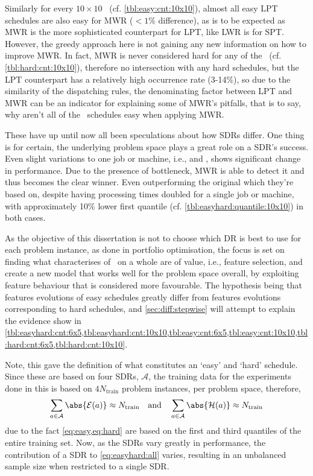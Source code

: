 Similarly for every $10\times10$ \JSP\ (cf. \cref{tbl:easy:cnt:10x10}), almost all easy LPT schedules are also easy  for MWR ($<1\%$ difference), as is to be expected as MWR is the more sophisticated counterpart for LPT, like LWR is for SPT. However, the greedy approach here is  not gaining any new information on how to improve MWR. In fact, MWR is never considered hard for any of the \JSP\ (cf. \cref{tbl:hard:cnt:10x10}), therefore no intersection with any hard schedules, but the LPT counterpart has a relatively high occurrence rate (3-14\%), so due to the similarity of the dispatching rules, the denominating factor between LPT and MWR can be an indicator for explaining some of MWR's pitfalls, that is to say, why aren't all of the \jsp\ schedules easy when applying MWR. 

These have up until now all been speculations about how SDRs differ. One thing is for certain, the underlying problem space plays a great role on a SDR's success. Even slight variations to one job or machine, i.e.,  and , shows significant change in performance. Due to the presence of bottleneck, MWR is able to detect it and thus becomes the clear winner. Even outperforming the original  which they're based on, despite having processing times doubled for a single job or machine, with approximately 10\% lower first quantile (cf. \cref{tbl:easyhard:quantile:10x10}) in both cases. 

As the objective of this dissertation is not to choose which DR is best to use for each problem instance, as done in portfolio optimisation, the focus is set on finding what characterises of \jsp\ on a whole are of value, i.e., feature selection, and create a new model that works well for the problem space overall, by exploiting feature behaviour that is considered more favourable. The hypothesis being that features evolutions of easy schedules greatly differ from features evolutions corresponding to hard schedules, and \cref{sec:diff:stepwise} will attempt to explain the evidence show in \cref{tbl:easyhard:cnt:6x5,tbl:easyhard:cnt:10x10,tbl:easy:cnt:6x5,tbl:easy:cnt:10x10,tbl:hard:cnt:6x5,tbl:hard:cnt:10x10}.

Note, this  gave the definition of what constitutes an `easy' and `hard' schedule. Since these are based on four SDRs, $\mathcal{A}$, the training data for the experiments done in this  is based on $4N_{\text{train}}$ problem instances, per problem space, therefore,
\begin{equation}\label{eq:easyhard:all}
\sum_{a\in\mathcal{A}}\abs{\mathcal{E}(a)} \approx N_{\text{train}}
\quad\text{and}\quad
\sum_{a\in\mathcal{A}}\abs{\mathcal{H}(a)} \approx N_{\text{train}}
\end{equation} 
due to the fact \cref{eq:easy,eq:hard} are based on the first and third quantiles of the entire training set.
Now, as the SDRs vary greatly in performance, the contribution of a SDR to \cref{eq:easyhard:all} varies, resulting in an unbalanced sample size when restricted to a single SDR. 

